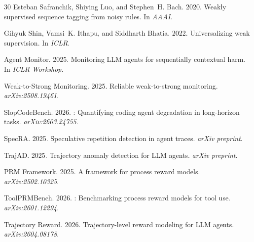 \documentclass[11pt,a4paper]{article}
\begin{document}
\begin{thebibliography}{30}
Esteban Safranchik, Shiying Luo, and Stephen~H. Bach. 2020.
\newblock Weakly supervised sequence tagging from noisy rules.
\newblock In \emph{AAAI}.

Gihyuk Shin, Vamsi~K. Ithapu, and Siddharth Bhatia. 2022.
\newblock Universalizing weak supervision.
\newblock In \emph{ICLR}.

{Agent Monitor}. 2025.
\newblock Monitoring {LLM} agents for sequentially contextual harm.
\newblock In \emph{ICLR Workshop}.

{Weak-to-Strong Monitoring}. 2025.
\newblock Reliable weak-to-strong monitoring.
\newblock \emph{arXiv:2508.19461}.

{SlopCodeBench}. 2026.
: Quantifying coding agent degradation in long-horizon tasks.
\newblock \emph{arXiv:2603.24755}.

{SpecRA}. 2025.
\newblock Speculative repetition detection in agent traces.
\newblock \emph{arXiv preprint}.

{TrajAD}. 2025.
\newblock Trajectory anomaly detection for {LLM} agents.
\newblock \emph{arXiv preprint}.

{PRM Framework}. 2025.
\newblock A framework for process reward models.
\newblock \emph{arXiv:2502.10325}.

{ToolPRMBench}. 2026.
: Benchmarking process reward models for tool use.
\newblock \emph{arXiv:2601.12294}.

{Trajectory Reward}. 2026.
\newblock Trajectory-level reward modeling for {LLM} agents.
\newblock \emph{arXiv:2604.08178}.

\end{thebibliography}
\end{document}
